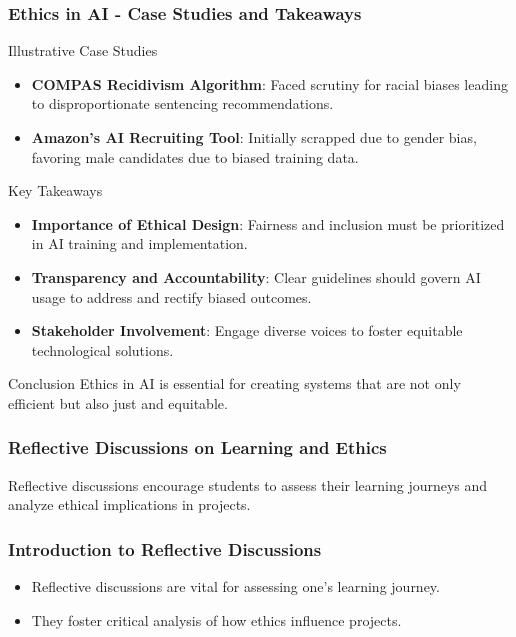 \documentclass[aspectratio=169]{beamer}
\begin{document}
\begin{frame}[fragile]
    \frametitle{Ethics in AI - Case Studies and Takeaways}
    \begin{block}{Illustrative Case Studies}
        \begin{itemize}
            \item \textbf{COMPAS Recidivism Algorithm}: Faced scrutiny for racial biases leading to disproportionate sentencing recommendations.
            \item \textbf{Amazon’s AI Recruiting Tool}: Initially scrapped due to gender bias, favoring male candidates due to biased training data.
        \end{itemize}
    \end{block}
    
    \begin{block}{Key Takeaways}
        \begin{itemize}
            \item \textbf{Importance of Ethical Design}: Fairness and inclusion must be prioritized in AI training and implementation.
            \item \textbf{Transparency and Accountability}: Clear guidelines should govern AI usage to address and rectify biased outcomes.
            \item \textbf{Stakeholder Involvement}: Engage diverse voices to foster equitable technological solutions.
        \end{itemize}
    \end{block}
    
    \begin{block}{Conclusion}
        Ethics in AI is essential for creating systems that are not only efficient but also just and equitable. 
    \end{block}
\end{frame}

\begin{frame}[fragile]
    \frametitle{Reflective Discussions on Learning and Ethics}
    Reflective discussions encourage students to assess their learning journeys and analyze ethical implications in projects.
\end{frame}

\begin{frame}[fragile]
    \frametitle{Introduction to Reflective Discussions}
    \begin{itemize}
        \item Reflective discussions are vital for assessing one's learning journey.
        \item They foster critical analysis of how ethics influence projects.
    \end{itemize}
\end{frame}
\end{document}
